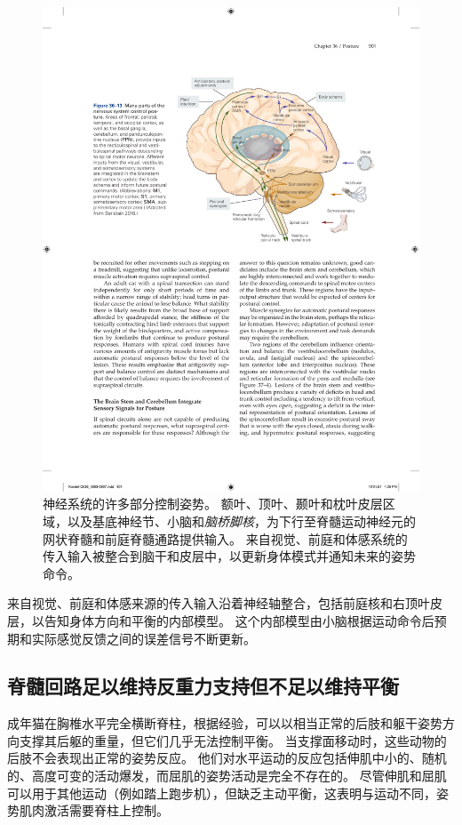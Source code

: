 \begin{figure}[htbp]
	\centering
	\includegraphics[width=0.85\linewidth]{chap36/fig_36_13}
	\caption{神经系统的许多部分控制姿势。
		额叶、顶叶、颞叶和枕叶皮层区域，以及基底神经节、小脑和\textit{脑桥脚核}，为下行至脊髓运动神经元的网状脊髓和前庭脊髓通路提供输入。
		来自视觉、前庭和体感系统的传入输入被整合到脑干和皮层中，以更新身体模式并通知未来的姿势命令。}
	\label{fig:36_13}
\end{figure}


来自视觉、前庭和体感来源的传入输入沿着神经轴整合，包括前庭核和右顶叶皮层，以告知身体方向和平衡的内部模型。
这个内部模型由小脑根据运动命令后预期和实际感觉反馈之间的误差信号不断更新。



\subsection{脊髓回路足以维持反重力支持但不足以维持平衡}

成年猫在胸椎水平完全横断脊柱，根据经验，可以以相当正常的后肢和躯干姿势方向支撑其后躯的重量，但它们几乎无法控制平衡。
当支撑面移动时，这些动物的后肢不会表现出正常的姿势反应。
他们对水平运动的反应包括伸肌中小的、随机的、高度可变的活动爆发，而屈肌的姿势活动是完全不存在的。
尽管伸肌和屈肌可以用于其他运动（例如踏上跑步机），但缺乏主动平衡，这表明与运动不同，姿势肌肉激活需要脊柱上控制。


